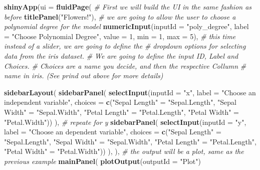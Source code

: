 \documentclass[]{article}
\newenvironment{Shaded}{\begin{snugshade}}{\end{snugshade}}
\newcommand{\CommentTok}[1]{\textcolor[rgb]{0.56,0.35,0.01}{\textit{#1}}}
\newcommand{\DataTypeTok}[1]{\textcolor[rgb]{0.13,0.29,0.53}{#1}}
\newcommand{\DecValTok}[1]{\textcolor[rgb]{0.00,0.00,0.81}{#1}}
\newcommand{\KeywordTok}[1]{\textcolor[rgb]{0.13,0.29,0.53}{\textbf{#1}}}
\newcommand{\NormalTok}[1]{#1}
\newcommand{\StringTok}[1]{\textcolor[rgb]{0.31,0.60,0.02}{#1}}
\begin{document}
\begin{Shaded}
\begin{Highlighting}[]
\KeywordTok{shinyApp}\NormalTok{(}\DataTypeTok{ui =} \KeywordTok{fluidPage}\NormalTok{(}
  \CommentTok{# First we will build the UI in the same fashion as before}
  \KeywordTok{titlePanel}\NormalTok{(}\StringTok{"Flowers!"}\NormalTok{),}
  \CommentTok{# we are going to allow the user to choose a polynomial degree for the model}
  \KeywordTok{numericInput}\NormalTok{(}\DataTypeTok{inputId =} \StringTok{"poly_degree"}\NormalTok{,}
                  \DataTypeTok{label =} \StringTok{"Choose Polynomial Degree"}\NormalTok{,}
                  \DataTypeTok{value =} \DecValTok{1}\NormalTok{, }\DataTypeTok{min =} \DecValTok{1}\NormalTok{, }\DataTypeTok{max =} \DecValTok{5}\NormalTok{),}
  \CommentTok{# this time instead of a slider, we are going to define the }
  \CommentTok{# dropdown options for selecting data from the iris dataset.}
  \CommentTok{# We are going to define the input ID, Label and Choices.}
  \CommentTok{# Choices are a name you decide, and then the respective Collumn }
  \CommentTok{# name in iris. (See prind out above for more details)}
  
  \KeywordTok{sidebarLayout}\NormalTok{(}
    \KeywordTok{sidebarPanel}\NormalTok{(}
      \KeywordTok{selectInput}\NormalTok{(}\DataTypeTok{inputId =} \StringTok{"x"}\NormalTok{,}
                  \DataTypeTok{label =} \StringTok{"Choose an independent variable"}\NormalTok{,}
                  \DataTypeTok{choices =} \KeywordTok{c}\NormalTok{(}\StringTok{"Sepal Length"}\NormalTok{ =}\StringTok{ "Sepal.Length"}\NormalTok{,}
                              \StringTok{"Sepal Width"}\NormalTok{ =}\StringTok{ "Sepal.Width"}\NormalTok{,}
                              \StringTok{"Petal Length"}\NormalTok{ =}\StringTok{ "Petal.Length"}\NormalTok{,}
                              \StringTok{"Petal Width"}\NormalTok{ =}\StringTok{ "Petal.Width"}\NormalTok{))}
\NormalTok{    ),}
    \CommentTok{# repeate for y}
    \KeywordTok{sidebarPanel}\NormalTok{(}
      \KeywordTok{selectInput}\NormalTok{(}\DataTypeTok{inputId =} \StringTok{"y"}\NormalTok{,}
                  \DataTypeTok{label =} \StringTok{"Choose an dependent variable"}\NormalTok{,}
                  \DataTypeTok{choices =} \KeywordTok{c}\NormalTok{(}\StringTok{"Sepal Length"}\NormalTok{ =}\StringTok{ "Sepal.Length"}\NormalTok{,}
                              \StringTok{"Sepal Width"}\NormalTok{ =}\StringTok{ "Sepal.Width"}\NormalTok{,}
                              \StringTok{"Petal Length"}\NormalTok{ =}\StringTok{ "Petal.Length"}\NormalTok{,}
                              \StringTok{"Petal Width"}\NormalTok{ =}\StringTok{ "Petal.Width"}\NormalTok{))}
\NormalTok{    ),}
\NormalTok{  ),}
  \CommentTok{# the output will be a plot, same as the previous example }
  \KeywordTok{mainPanel}\NormalTok{(}
    \KeywordTok{plotOutput}\NormalTok{(}\DataTypeTok{outputId =} \StringTok{"Plot"}\NormalTok{)}


\end{Highlighting}
\end{Shaded}
\end{document}

